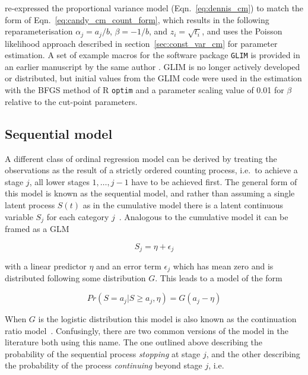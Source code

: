 \citet{candy1991modeling} re-expressed the proportional variance model (Eqn.~\ref{eq:dennis_cm}) to match the form of Eqn.~\ref{eq:candy_cm_count_form}, which results in the following re\-para\-meter\-isation $\alpha_j = a_j/b$, $\beta = -1/b$, and $z_i = \sqrt{t_i}$, and uses the Poisson likelihood approach described in section~\ref{sec:const_var_cm} for parameter estimation. 
A set of example macros for the software package \verb+GLIM+ \citep{aitkin1989statistical} is provided in an earlier manuscript by the same author \citep{candy1990biology}. GLIM is no longer actively developed or distributed, but initial values from the GLIM code were used in the estimation with the BFGS method of R \verb+optim+ and a parameter scaling value of 0.01 for $\beta$ relative to the cut-point parameters.

\subsection{Sequential model}
A different class of ordinal regression model can be derived by treating the observations as the result of a strictly ordered counting process, i.e.\ to achieve a stage $j$, all lower stages $1,\dots,j-1$ have to be achieved first. 
The general form of this model is known as the sequential model, and rather than assuming a single latent process $S(t)$ as in the cumulative model there is a latent continuous variable $S_j$ for each category $j$~\citep{burkner2019ordinal}. 
Analogous to the cumulative model it can be framed as a GLM 

\begin{equation}
S_j = \eta + \epsilon_j
\end{equation}

with a linear predictor $\eta$ and an error term $\epsilon_j$ which has mean zero and is distributed following some distribution $G$. 
This leads to a model of the form 

\begin{equation}
Pr(S = a_j|S \geq a_j, \eta) = G(a_j - \eta)
\end{equation}

When $G$ is the logistic distribution this model is also known as the continuation ratio model~\citep{fienberg1980analysis,burkner2019ordinal}. 
Confusingly, there are two common versions of the model in the literature both using this name. 
The one outlined above describing the probability of the sequential process \emph{stopping} at stage $j$, and the other describing the probability of the process \emph{continuing} beyond stage $j$, i.e. 

